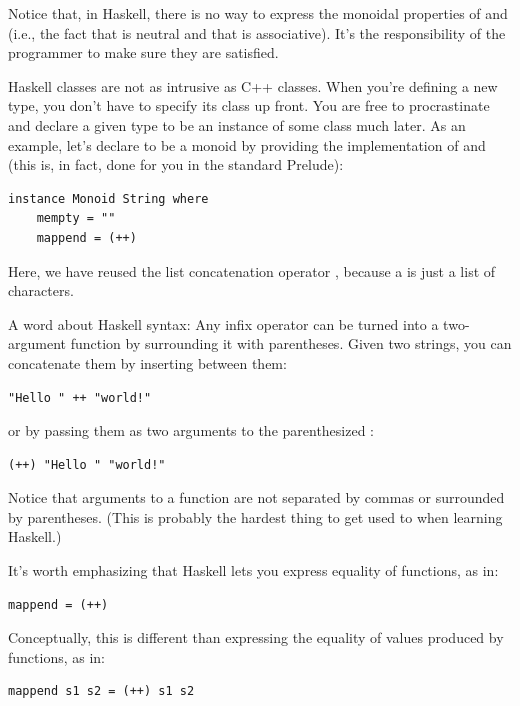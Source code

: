 Notice that, in Haskell, there is no way to express the monoidal
properties of  and  (i.e., the fact that
 is neutral and that  is associative).
It's the responsibility of the programmer to make sure they are
satisfied.

Haskell classes are not as intrusive as C++ classes. When you're
defining a new type, you don't have to specify its class up front. You
are free to procrastinate and declare a given type to be an instance of
some class much later. As an example, let's declare  to
be a monoid by providing the implementation of  and
 (this is, in fact, done for you in the standard
Prelude):

\begin{verbatim}
instance Monoid String where
    mempty = ""
    mappend = (++)
\end{verbatim}

Here, we have reused the list concatenation operator \code{(++)},
because a  is just a list of characters.

A word about Haskell syntax: Any infix operator can be turned into a
two-argument function by surrounding it with parentheses. Given two
strings, you can concatenate them by inserting \code{++} between them:

\begin{verbatim}
"Hello " ++ "world!"
\end{verbatim}

or by passing them as two arguments to the parenthesized \code{(++)}:

\begin{verbatim}
(++) "Hello " "world!"
\end{verbatim}

Notice that arguments to a function are not separated by commas or
surrounded by parentheses. (This is probably the hardest thing to get
used to when learning Haskell.)

It's worth emphasizing that Haskell lets you express equality of
functions, as in:

\begin{verbatim}
mappend = (++)
\end{verbatim}

Conceptually, this is different than expressing the equality of values
produced by functions, as in:

\begin{verbatim}
mappend s1 s2 = (++) s1 s2
\end{verbatim}

